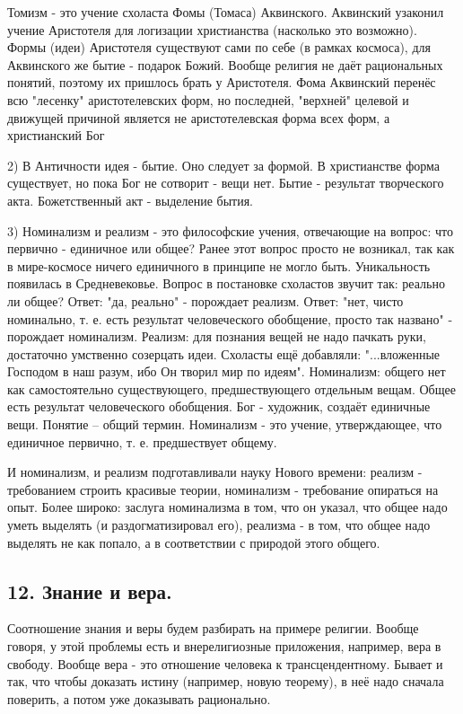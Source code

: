 \documentclass[a4paper, 12pt]{article}
\begin{document}
Томизм - это учение схоласта Фомы (Томаса) Аквинского.
Аквинский узаконил учение Аристотеля для логизации христианства (насколько это возможно). Формы (идеи) Аристотеля существуют сами по себе (в рамках космоса), для Аквинского же бытие - подарок Божий. Вообще религия не даёт рациональных понятий, поэтому их пришлось брать у Аристотеля. Фома Аквинский перенёс всю "лесенку" аристотелевских форм, но последней, "верхней" целевой и движущей причиной является не аристотелевская форма всех форм, а христианский Бог

2) В Античности идея - бытие. Оно следует за формой. В христианстве форма существует, но пока Бог не сотворит - вещи нет. Бытие - результат творческого акта. Божетственный акт - выделение бытия.

3) Номинализм и реализм - это философские учения, отвечающие на вопрос: что первично - единичное или общее? Ранее этот вопрос просто не возникал, так как в мире-космосе ничего единичного в принципе не могло быть. Уникальность появилась в Средневековье. Вопрос в постановке схоластов звучит так: реально ли общее? Ответ: "да, реально" - порождает реализм. Ответ: "нет, чисто номинально, т. е. есть результат человеческого обобщение, просто так названо" - порождает номинализм.
Реализм: для познания вещей не надо пачкать руки, достаточно умственно созерцать идеи. Схоласты ещё добавляли: "...вложенные Господом в наш разум, ибо Он творил мир по идеям".
Номинализм: общего нет как самостоятельно существующего, предшествующего отдельным вещам. Общее есть результат человеческого обобщения. Бог - художник, создаёт единичные вещи. Понятие – общий термин. Номинализм - это учение, утверждающее, что единичное первично, т. е. предшествует общему.

И номинализм, и реализм подготавливали науку Нового времени: реализм - требованием строить красивые теории, номинализм - требование опираться на опыт.
Более широко: заслуга номинализма в том, что он указал, что общее надо уметь выделять (и раздогматизировал его), реализма - в том, что общее надо выделять не как попало, а в соответствии с природой этого общего.
\subsection*{\textbf{12. Знание и вера.}}
Соотношение знания и веры будем разбирать на примере религии.
Вообще говоря, у этой проблемы есть и внерелигиозные приложения, например, вера в свободу.
Вообще вера - это отношение человека к трансцендентному.
Бывает и так, что чтобы доказать истину (например, новую теорему), в неё надо сначала поверить, а потом уже доказывать рационально.
\end{document}
